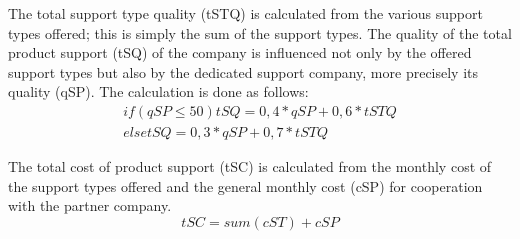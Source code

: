 The total support type quality (\gls{tSTQ}) is calculated from the various support types offered; this is simply the sum of the support types. The quality of the total product support (\gls{tSQ}) of the company is influenced not only by the offered support types but also by the dedicated support company, more precisely its quality (\gls{qSP}). The calculation is done as follows:
\begin{equation}
\begin{aligned}
    if ( qSP ≤ 50 ) tSQ = { 0,4 *qSP + 0,6 * tSTQ } \\
    else tSQ = { 0,3 * qSP + 0,7 * tSTQ }
\end{aligned}
\end{equation}

The total cost of product support (\gls{tSC}) is calculated from the monthly cost of the support types offered and the general monthly cost (\gls{cSP}) for cooperation with the partner company.
\begin{equation}
    tSC = sum (cST) + cSP
\end{equation}